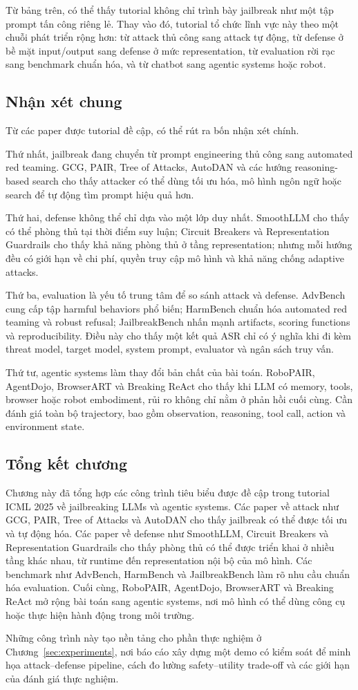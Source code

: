 Từ bảng trên, có thể thấy tutorial không chỉ trình bày jailbreak như một
tập prompt tấn công riêng lẻ. Thay vào đó, tutorial tổ chức lĩnh vực này
theo một chuỗi phát triển rộng hơn: từ attack thủ công sang attack tự động,
từ defense ở bề mặt input/output sang defense ở mức representation, từ
evaluation rời rạc sang benchmark chuẩn hóa, và từ chatbot sang agentic
systems hoặc robot.

\subsection{Nhận xét chung}
\label{subsec:tutorial-paper-discussion}

Từ các paper được tutorial đề cập, có thể rút ra bốn nhận xét chính.

Thứ nhất, jailbreak đang chuyển từ prompt engineering thủ công sang
automated red teaming. GCG, PAIR, Tree of Attacks, AutoDAN và các hướng
reasoning-based search cho thấy attacker có thể dùng tối ưu hóa, mô hình
ngôn ngữ hoặc search để tự động tìm prompt hiệu quả hơn.

Thứ hai, defense không thể chỉ dựa vào một lớp duy nhất. SmoothLLM cho thấy
có thể phòng thủ tại thời điểm suy luận; Circuit Breakers và Representation
Guardrails cho thấy khả năng phòng thủ ở tầng representation; nhưng mỗi
hướng đều có giới hạn về chi phí, quyền truy cập mô hình và khả năng chống
adaptive attacks.

Thứ ba, evaluation là yếu tố trung tâm để so sánh attack và defense.
AdvBench cung cấp tập harmful behaviors phổ biến; HarmBench chuẩn hóa
automated red teaming và robust refusal; JailbreakBench nhấn mạnh
artifacts, scoring functions và reproducibility. Điều này cho thấy một kết
quả ASR chỉ có ý nghĩa khi đi kèm threat model, target model, system prompt,
evaluator và ngân sách truy vấn.

Thứ tư, agentic systems làm thay đổi bản chất của bài toán. RoboPAIR,
AgentDojo, BrowserART và Breaking ReAct cho thấy khi LLM có memory, tools,
browser hoặc robot embodiment, rủi ro không chỉ nằm ở phản hồi cuối cùng.
Cần đánh giá toàn bộ trajectory, bao gồm observation, reasoning, tool call,
action và environment state.

\subsection{Tổng kết chương}
\label{subsec:tutorial-paper-summary}

Chương này đã tổng hợp các công trình tiêu biểu được đề cập trong tutorial
ICML 2025 về jailbreaking LLMs và agentic systems. Các paper về attack như
GCG, PAIR, Tree of Attacks và AutoDAN cho thấy jailbreak có thể được tối ưu
và tự động hóa. Các paper về defense như SmoothLLM, Circuit Breakers và
Representation Guardrails cho thấy phòng thủ có thể được triển khai ở nhiều
tầng khác nhau, từ runtime đến representation nội bộ của mô hình. Các
benchmark như AdvBench, HarmBench và JailbreakBench làm rõ nhu cầu chuẩn
hóa evaluation. Cuối cùng, RoboPAIR, AgentDojo, BrowserART và Breaking
ReAct mở rộng bài toán sang agentic systems, nơi mô hình có thể dùng công
cụ hoặc thực hiện hành động trong môi trường.

Những công trình này tạo nền tảng cho phần thực nghiệm ở
Chương~\ref{sec:experiments}, nơi báo cáo xây dựng một demo có kiểm soát
để minh họa attack--defense pipeline, cách đo lường safety--utility
trade-off và các giới hạn của đánh giá thực nghiệm.